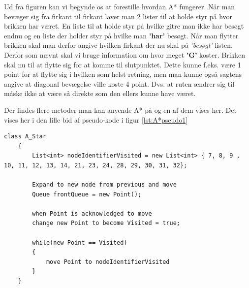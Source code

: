 Ud fra figuren kan vi begynde os at forestille hvordan A* fungerer. Når man bevæger sig fra firkant til firkant laver man 2 lister til at holde styr på hvor brikken har været. En liste til at holde styr på hvilke gitre man ikke har besøgt endnu og en liste der holder styr på hvilke man \textbf{'har'} besøgt. Når man flytter brikken skal man derfor angive hvilken firkant der nu skal på \textit{'besøgt'} listen. Derfor som nævnt skal vi bruge information om hvor meget \textbf{'G'} koster. Brikken skal nu til at flytte sig for at komme til slutpunktet. Dette kunne f.eks. være 1 point for at flytte sig i hvilken som helst retning, men man kunne også sagtens angive at diagonal bevægelse ville koste 4 point. Dvs. at ruten ændrer sig til måske ikke at være så direkte som den ellers kunne have været.

Der findes flere metoder man kan anvende A* på og en af dem vises her.
Det vises her i den lille bid af pseudo-kode i figur \ref{lst:A*pseudo1}
\begin{lstlisting}[caption={Pseudo-kode af lister i A*},label={lst:A*pseudo1}]
	class A_Star
	{
		List<int> nodeIdentifierVisited = new List<int> { 7, 8, 9 , 10, 11, 12, 13, 14, 21, 23, 24, 28, 29, 30, 31, 32};

		Expand to new node from previous and move
		Queue frontQueue = new Point();

		when Point is acknowledged to move
		change new Point to become Visited = true;

		while(new Point == Visited)
		{
			move Point to nodeIdentifierVisited
		}
	}
\end{lstlisting}